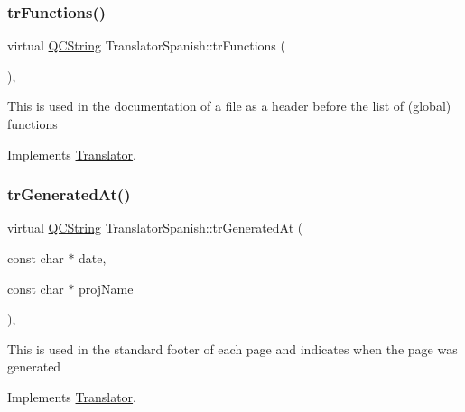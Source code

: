 \mbox{\label{class_translator_spanish_a0c8a591372838ed2e79b15a64576967e}} 
\subsubsection{\texorpdfstring{trFunctions()}{trFunctions()}}
{\footnotesize\ttfamily virtual \mbox{\hyperlink{class_q_c_string}{Q\+C\+String}} Translator\+Spanish\+::tr\+Functions (\begin{DoxyParamCaption}{ }\end{DoxyParamCaption})\hspace{0.3cm}{\ttfamily [inline]}, {\ttfamily [virtual]}}

This is used in the documentation of a file as a header before the list of (global) functions 

Implements \mbox{\hyperlink{class_translator}{Translator}}.

\mbox{\label{class_translator_spanish_a306c4f221d35b13d611c5b542a81f29c}} 
\subsubsection{\texorpdfstring{trGeneratedAt()}{trGeneratedAt()}}
{\footnotesize\ttfamily virtual \mbox{\hyperlink{class_q_c_string}{Q\+C\+String}} Translator\+Spanish\+::tr\+Generated\+At (\begin{DoxyParamCaption}\item[{const char $\ast$}]{date,  }\item[{const char $\ast$}]{proj\+Name }\end{DoxyParamCaption})\hspace{0.3cm}{\ttfamily [inline]}, {\ttfamily [virtual]}}

This is used in the standard footer of each page and indicates when the page was generated 

Implements \mbox{\hyperlink{class_translator}{Translator}}.

\mbox{\label{class_translator_spanish_a654590166068588081749bd1b3d34f1a}} 
